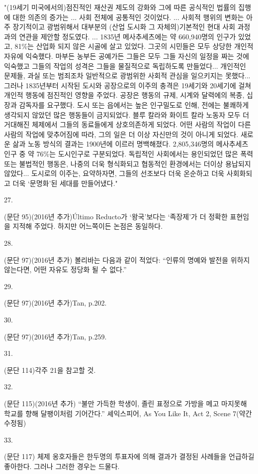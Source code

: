 \documentclass[11pt,a4paper]{article}
\begin{document}
\begin{multicols}{2}
"(19세기 미국에서의)점진적인 재산권 제도의 강화와 그에 따른 공식적인 법률의 집행에 대한 의존의  증가는 ... 사회 전체에 공통적인 것이었다. ... 사회적 행위의 변화는 아주 장기적이고 광범위해서  대부분의 (산업 도시화 그 자체의)기본적인 현대 사회 과정과의 연관을 제안할 정도였다. ... 1835년  메사추세츠에는 약 660,940명의 인구가 있었고, 81\%는 산업화 되지 않은 시골에 살고 있었다. 그곳의 시민들은 모두 상당한 개인적 자유에 익숙했다. 마부든 농부든 공예가든 그들은 모두 그들 자신의 일정을 짜는 것에 익숙했고 그들의 작업의 성격은 그들을 물질적으로 독립하도록 만들었다... 개인적인 문제들, 과실 또는 범죄조차 일반적으로 광범위한 사회적 관심을 일으키지는 못했다... 그러나 1835년부터 시작된 도시와 공장으로의 이주의 충격은 19세기와 20세기에 걸쳐 개인적 행동에 점진적인 영향을 주었다. 공장은 행동의 규제, 시계와 달력에의 복종, 십장과 감독자를 요구했다. 도시 또는 읍에서는 높은 인구밀도로 인해, 전에는 불쾌하게 생각되지 않았던 많은 행동들이  금지되었다. 블루 칼라와 화이트 칼라 노동자 모두 더 거대해진 체제에서 그들의 동료들에게  상호의존하게 되었다. 어떤 사람의 작업이 다른 사람의 작업에 맞추어짐에 따라, 그의 일은 더 이상 자신만의 것이 아니게 되었다. 새로운 삶과 노동 방식의 결과는 1900년에 이르러 명백해졌다. 2,805,346명의 메사추세츠 인구 중 약 76\%는 도시인구로 구분되었다. 독립적인 사회에서는 용인되었던 많은 폭력 또는 불법적인 행동은, 나중의 더욱 형식화되고 협동적인 환경에서는 더이상  용납되지 않았다... 도시로의 이주는, 요약하자면, 그들의 선조보다 더욱 온순하고 더욱 사회화되고 더욱 `문명화'된 세대를 만들어냈다." 

\hypertarget{27}{27.} (문단 95)(2016년 추가)Último Reducto가 ‘왕국’보다는 ‘족장제’가 더 정확한 표현임을 지적해  주었다. 하지만 어느쪽이든 논점은 동일하다. 


\hypertarget{28}{28.} (문단 97)(2016년 추가) 볼리바는 다음과 같이 적었다: “인류의 명예와 발전을 위하지 않는다면,  어떤 자유도 정당화 될 수 없다.” 


\hypertarget{29}{29.} (문단 97)(2016년 추가)Tan, p.202. 


\hypertarget{30}{30.} (문단 97)(2016년 추가)Tan, p.259. 


\hypertarget{31}{31.} (문단 114)각주 21을 참고할 것. 


\hypertarget{32}{32.} (문단 115)(2016년 추가) “불만 가득한 학생이, 졸린 표정으로 가방을 메고 마지못해 학교를 향해  달팽이처럼 기어간다.” 셰익스피어, As You Like It, Act 2, Scene 7(약간 수정됨)


\hypertarget{33}{33.} (문단 117) 체제 옹호자들은 한두명의 투표자에 의해 결과가 결정된 사례들을 언급하길 좋아한다.  그러나 그러한 경우는 드물다. 



\end{multicols}
\end{document}

